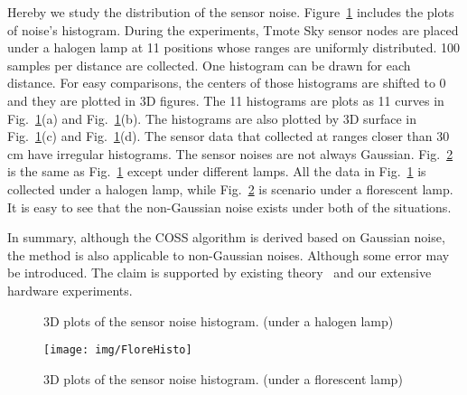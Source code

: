     Hereby we study the distribution of the sensor noise.
    Figure~\ref{f:hist3d} includes the plots of noise's histogram. During the experiments, Tmote Sky sensor nodes are placed under a halogen lamp at 11 positions whose ranges are uniformly distributed. 100 samples per distance are collected. One histogram can be drawn for each distance. For easy comparisons, the centers of those histograms are shifted to 0 and they are plotted in 3D figures.
      The 11 histograms are plots as 11 curves in Fig.~\ref{f:hist3d}(a) and Fig.~\ref{f:hist3d}(b). The histograms are also plotted by 3D surface in Fig.~\ref{f:hist3d}(c) and Fig.~\ref{f:hist3d}(d). The sensor data that collected at ranges closer than 30 cm have irregular histograms.
      The sensor noises are not always Gaussian.
    Fig.~\ref{f:hist3dflor} is the same as Fig.~\ref{f:hist3d} except under different lamps. All the data in Fig.~\ref{f:hist3d} is collected under a halogen lamp, while Fig.~\ref{f:hist3dflor} is scenario under a florescent lamp. It is easy to see that the non-Gaussian noise exists under both of the situations.

In summary, although the COSS algorithm is derived based on Gaussian noise, the method is also applicable to non-Gaussian noises. Although some error may be introduced. The claim is supported by existing theory~\cite{EmeryOED98} and our extensive hardware experiments.

\begin{figure}
  \centering
  \caption{3D plots of the sensor noise histogram. (under a halogen lamp)}\label{f:hist3d}
\end{figure}


\begin{figure}
  \centering
  \texttt{[image: img/FloreHisto]}
  \caption{3D plots of the sensor noise histogram. (under a florescent lamp)}\label{f:hist3dflor}
\end{figure}

